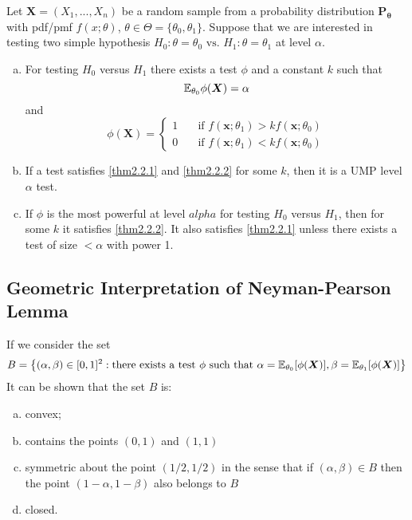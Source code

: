 \begin{theorem}\label{Neyman-Pearson Lemma}
Let $\boldsymbol{X} = (X_1,...,X_n)$ be a random sample from a probability distribution $\boldsymbol{P_{\theta}}$ with pdf/pmf $f(x;\theta)$, $\theta \in \Theta = \{\theta_0, \theta_1\}$. Suppose that we are interested in testing two simple hypothesis 
$
H_0: \theta = \theta_0 \text{ vs. } H_1:\theta = \theta_1
$
at level $\alpha$.
\begin{enumerate}[(a)]
    \item For testing $H_0$ versus $H_1$ there exists a test $\phi$ and a constant $k$ such that 
    \begin{equation}\label{thm2.2.1}
        \mathbb E_{\theta_{0}}\phi(\boldsymbol{X}) = \alpha
    \end{equation}
    and
    \begin{equation}\label{thm2.2.2}
    \phi(\boldsymbol{X}) = 
    \begin{cases}
    1 \quad& \text{if } f( \boldsymbol{x};\theta_1) > kf( \boldsymbol{x}; \theta_0) \\
    0 & \text{if } f( \boldsymbol{x}; \theta_1) < kf( \boldsymbol{x}; \theta_0)
    \end{cases}
    \end{equation}
    \item If a test satisfies \ref{thm2.2.1} and \ref{thm2.2.2} for some $k$, then it is a UMP level $\alpha$ test. 
    \item If $\phi$ is the most powerful at level $alpha$ for testing $H_0$ versus $H_1$, then for some $k$ it satisfies \ref{thm2.2.2}. It also satisfies \ref{thm2.2.1} unless there exists a test of size $< \alpha$ with power 1.
\end{enumerate}
\end{theorem}

\subsection{Geometric Interpretation of Neyman-Pearson Lemma}
If we consider the set
$$
B = \left \{ 
(\alpha,\beta) \in [0,1]^2: \text{there exists a test $\phi$ such that }
\alpha = \mathbb E_{\theta_0}[\phi(\boldsymbol{X})], \beta = \mathbb E_{\theta_1}[\phi(\boldsymbol{X})] 
\right \}
$$
It can be shown that the set $B$ is:
\begin{enumerate}[(a)]
    \item convex;
    \item contains the points $(0,1)$ and $(1,1)$
    \item symmetric about the point $(1/2,1/2)$ in the sense that if $(\alpha,\beta) \in B$ then the point $(1-\alpha,1-\beta)$ also belongs to $B$
    \item closed.
\end{enumerate}